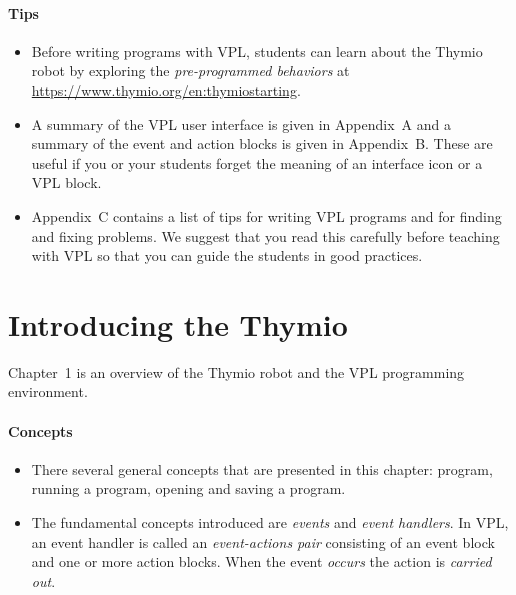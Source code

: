 \documentclass[11pt,a4paper,english]{article}
\begin{document}
\paragraph{Tips}
\begin{itemize}

\item Before writing programs with VPL, students can learn about the
Thymio robot by exploring the \emph{pre-programmed behaviors}
at \href{https://www.thymio.org/en:thymiostarting}%
{https://www.thymio.org/en:thymiostarting}.

\item A summary of the VPL user interface is given in Appendix~A and a
summary of the event and action blocks is given in Appendix~B.
These are useful if you or your students forget the meaning of an
interface icon or a VPL block.

\item Appendix~C contains a list of tips for writing VPL programs
and for finding and fixing problems. We suggest that you read this
carefully before teaching with VPL so that you can guide the students
in good practices.

\end{itemize}


\newpage

\section{Introducing the Thymio}

Chapter~1 is an overview of the Thymio robot and the VPL programming
environment.

\paragraph{Concepts}

\begin{itemize}

\item There several general concepts that are presented in this
chapter: program, running a program, opening and saving a program.

\item The fundamental concepts introduced are \emph{events} and
\emph{event handlers}. In VPL, an event handler is called an
\emph{event-actions pair} consisting of an event block and one or more
action blocks. When the event \emph{occurs} the action is \emph{carried
out}.


\end{itemize}
\end{document}
